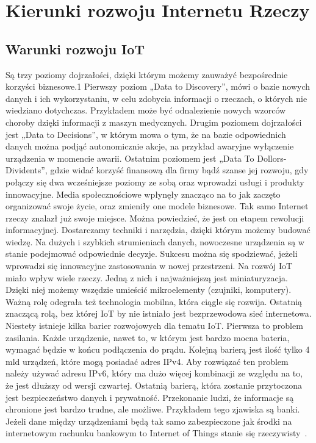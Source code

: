 \documentclass[brudnopis]{xmgr}
\begin{document}
\chapter{Kierunki rozwoju Internetu Rzeczy}

\section{Warunki rozwoju IoT}

Są trzy poziomy dojrzałości, dzięki którym możemy zauważyć bezpośrednie korzyści biznesowe.1
Pierwszy poziom „Data to Discovery”, mówi o bazie nowych danych i ich wykorzystaniu, w celu  zdobycia informacji o rzeczach, o których nie wiedziano dotychczas. Przykładem może być odnalezienie nowych wzorców choroby dzięki informacji z maszyn medycznych. 
Drugim poziomem dojrzałości jest „Data to Decisions”, w którym mowa o tym, że na bazie odpowiednich danych można podjąć autonomicznie akcje, na przykład awaryjne wyłączenie urządzenia w momencie awarii. 
Ostatnim poziomem jest „Data To Dollors-Dividents”, gdzie widać korzyść finansową dla firmy bądź szanse jej rozwoju, gdy połączy się dwa wcześniejsze poziomy ze sobą oraz wprowadzi usługi i produkty innowacyjne. 
Media społecznościowe wpłynęły znacząco na to jak zaczęto organizować swoje życie, oraz zmieniły one modele biznesowe. Tak samo Internet rzeczy znalazł już swoje miejsce. Można powiedzieć, że jest on etapem rewolucji informacyjnej. Dostarczamy techniki i narzędzia, dzięki którym możemy budować wiedzę. Na dużych i szybkich strumieniach danych, nowoczesne urządzenia są w stanie podejmować odpowiednie decyzje. Sukcesu można się spodziewać, jeżeli wprowadzi się innowacyjne zastosowania w nowej przestrzeni. 
Na rozwój IoT miało wpływ wiele rzeczy. Jedną z nich i najważniejszą jest miniaturyzacja. Dzięki niej możemy wszędzie umieścić mikroelementy (czujniki, komputery). Ważną rolę odegrała też technologia mobilna, która ciągle się rozwija. Ostatnią znaczącą rolą, bez której IoT by nie istniało jest bezprzewodowa sieć internetowa. 
Niestety istnieje kilka barier rozwojowych dla tematu IoT. Pierwsza to problem zasilania. Każde urządzenie, nawet to, w którym jest bardzo mocna bateria, wymagać będzie w końcu podłączenia do prądu. Kolejną barierą jest ilość tylko 4 mld urządzeń, które mogą posiadać adres IPv4. Aby rozwiązać ten problem należy używać adresu IPv6, który ma dużo więcej kombinacji ze względu na to, że jest dłuższy od wersji czwartej. Ostatnią barierą, która zostanie przytoczona jest bezpieczeństwo danych i prywatność. Przekonanie ludzi, że informacje są chronione jest bardzo trudne, ale możliwe. Przykładem tego zjawiska są banki. Jeżeli dane między urządzeniami będą tak samo zabezpieczone jak środki na internetowym rachunku bankowym to Internet of Things stanie się rzeczywisty~\cite{KeyApplications}.
\end{document}
